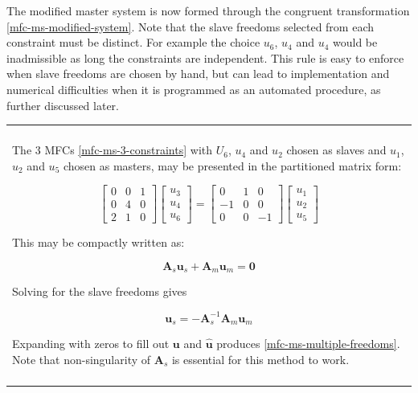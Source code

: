 \documentclass[10pt,b5paper,titlepage]{book}
\newenvironment{bbox}[1][0.96]
{
    \begin{center}
        \begin{tabular}{|p{#1\textwidth}|}
            \hline\\
}
{
            \\\\\hline
        \end{tabular}
    \end{center}
}
\begin{document}
The modified master system is now formed through the congruent
transformation \eqref{mfc-ms-modified-system}.
Note that the slave freedoms selected from each
constraint must be distinct. For example the choice $ u_6 $, $ u_4 $ and $ u_4 $
would be inadmissible as long the constraints are independent. This rule is easy
to enforce when slave freedoms are chosen by hand, but can lead to implementation
and numerical difficulties when it is programmed as an automated procedure, as
further discussed later.

\begin{bbox}
    The 3 MFCs \eqref{mfc-ms-3-constraints} with $ U_6 $, $ u_4 $ and $ u_2 $ chosen
    as slaves and $ u_1 $, $ u_2 $ and $ u_5 $ chosen as masters, may be presented
    in the partitioned matrix form:

    \begin{equation}
        \begin{bmatrix}
            0 & 0 & 1 \\
            0 & 4 & 0 \\
            2 & 1 & 0
        \end{bmatrix}
        \begin{bmatrix}
            u_3 \\
            u_4 \\
            u_6
        \end{bmatrix}
        = \begin{bmatrix}
            0 & 1 & 0 \\
            -1 & 0 & 0 \\
            0 & 0 & -1
        \end{bmatrix}
        \begin{bmatrix}
            u_1 \\
            u_2 \\
            u_5
        \end{bmatrix}
    \end{equation}

     This may be compactly written as:

     \begin{equation}
         \mathbf{A}_s \mathbf{u}_s + \mathbf{A}_m \mathbf{u}_m = \mathbf{0}
     \end{equation}

     Solving for the slave freedoms gives

     \begin{equation}
         \mathbf{u}_s = -\mathbf{A}_s^{-1} \mathbf{A}_m \mathbf{u}_m
     \end{equation}

     Expanding with zeros to fill out $ \mathbf{u} $ and $ \mathbf{\hat{u}} $
     produces \eqref{mfc-ms-multiple-freedoms}. Note that non-singularity of
     $ \mathbf{A}_s $ is essential for this method to work.
\end{bbox}
\end{document}
